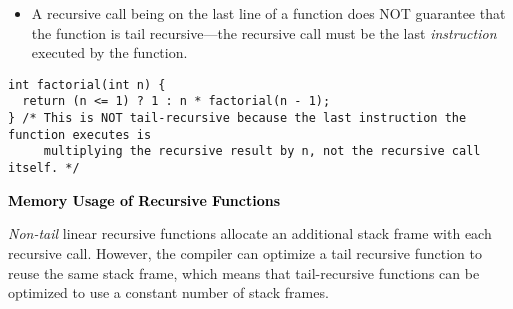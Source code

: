 \documentclass[6.6pt, twocolumn]{extarticle}
\newcommand{\itemwarning}{\item[\textcolor{warning}{{\scalebox{0.95}{\faWarning}}}]}
\newcommand{\blueheader}[1]{\textcolor{black}{\fontsize{7.00pt}{1.0}\bfseries{#1}}\vspace{0.2ex} }
\renewcommand{\footnotesize}{\fontsize{5.25pt}{6.3pt}\selectfont}
\begin{document}

\begin{itemize}
    \itemwarning A recursive call being on the last line of a function does NOT guarantee that the function is tail recursive—the recursive call must be the last \textit{instruction} executed by the function.
\end{itemize}

 \begin{tcolorbox}[top=-4pt,bottom=-4pt,left=-7.5pt,right=-1pt,center title,toptitle=-0.6mm,
  bottomtitle=-0.6mm,before skip = 3pt, after skip = 3pt,
  ]
              \begin{lstlisting}[style = mystyle]
int factorial(int n) {
  return (n <= 1) ? 1 : n * factorial(n - 1);
} /* This is NOT tail-recursive because the last instruction the function executes is 
     multiplying the recursive result by n, not the recursive call itself. */
\end{lstlisting}
\end{tcolorbox}




\blueheader{Memory Usage of Recursive Functions}

\textit{Non-tail} linear recursive functions allocate an additional stack frame with each recursive call. However, the compiler can optimize a tail recursive function to reuse the same stack frame, which means that tail-recursive functions can be optimized to use a constant number of stack frames.
\end{document}
